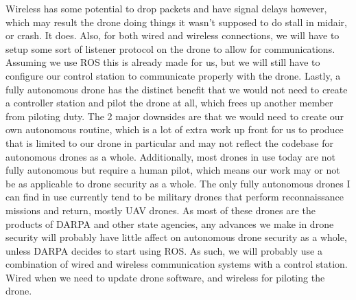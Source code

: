 \documentclass[IEEEtran,letterpaper,10pt,titlepage,draftclsnofoot,onecolumn]{article}
\begin{document}
Wireless has some potential to drop packets and have signal delays however, which may result the drone doing things it wasn't supposed to do stall in midair, or crash. It does. 
Also, for both wired and wireless connections, we will have to setup some sort of listener protocol on the drone to allow for communications. 
Assuming we use ROS this is already made for us, but we will still have to configure our control station to communicate properly with the drone. 
Lastly, a fully autonomous drone has the distinct benefit that we would not need to create a controller station and pilot the drone at all, which frees up another member from piloting duty. 
The 2 major downsides are that we would need to create our own autonomous routine, which is a lot of extra work up front for us to produce that is limited to our drone in particular and may not reflect the codebase for autonomous drones as a whole. 
Additionally, most drones in use today are not fully autonomous but require a human pilot, which means our work may or not be as applicable to drone security as a whole. 
The only fully autonomous drones I can find in use currently tend to be military drones that perform reconnaissance missions and return, mostly UAV drones. 
As most of these drones are the products of DARPA and other state agencies, any advances we make in drone security will probably have little affect on autonomous drone security as a whole, unless DARPA decides to start using ROS. 
As such, we will probably use a combination of wired and wireless communication systems with a control station. 
Wired when we need to update drone software, and wireless for piloting the drone.
\end{document}
